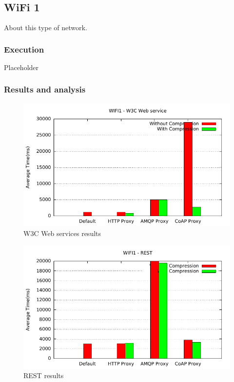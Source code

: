 \subsection{WiFi 1}

About this type of network.

\subsubsection{Execution}
Placeholder

\subsubsection{Results and analysis}

\begin{figure}[H]
\center
\includegraphics[scale=0.75]{../results/wifi1/nffi/out.pdf}
\caption{W3C Web services results}
\end{figure}

\begin{figure}[H]
\center
\includegraphics[scale=0.75]{../results/wifi1/rest/out.pdf}
\caption{REST results}
\end{figure}


